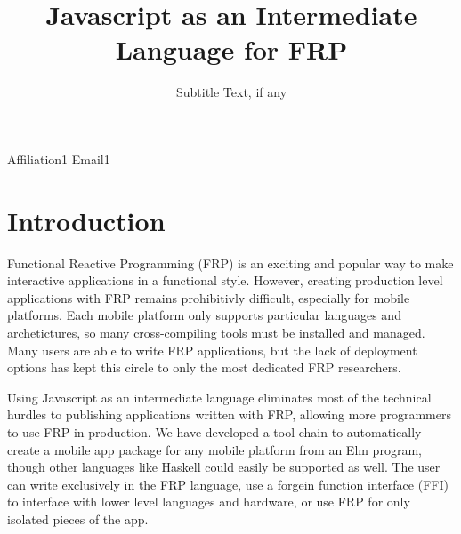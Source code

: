 \documentclass{preprint}
\begin{document}
\setlength{\pdfpageheight}{\paperheight}
\setlength{\pdfpagewidth}{\paperwidth}






\title{Javascript as an Intermediate Language for FRP}
\subtitle{Subtitle Text, if any}

           {Affiliation1}
           {Email1}

\maketitle

\section{Introduction}

Functional Reactive Programming (FRP) is an exciting and popular way to make interactive applications in a functional style.
However, creating production level applications with FRP remains prohibitivly difficult, especially for mobile platforms.
Each mobile platform only supports particular languages and archetictures, so many cross-compiling tools must be installed and managed.
Many users are able to write FRP applications, but the lack of deployment options has kept this circle to only the most dedicated FRP researchers.

Using Javascript as an intermediate language eliminates most of the technical hurdles to publishing applications written with FRP, allowing more programmers to use FRP in production.
We have developed a tool chain to automatically create a mobile app package for any mobile platform from an Elm program, though other languages like Haskell could easily be supported as well.
The user can write exclusively in the FRP language, use a forgein function interface (FFI) to interface with lower level languages and hardware, or use FRP for only isolated pieces of the app.
\end{document}
